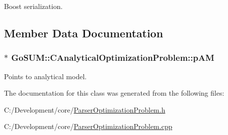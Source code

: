 Boost serialization. 



\subsection{Member Data Documentation}
\hypertarget{class_go_s_u_m_1_1_c_analytical_optimization_problem_a31c65e8da1ad012c97e4c722120b0b0e}{
\subsubsection[{p\-A\-M}]{$\ast$ Go\-S\-U\-M\-::\-C\-Analytical\-Optimization\-Problem\-::p\-A\-M\hspace{0.3cm}{\ttfamily [protected]}}}\label{class_go_s_u_m_1_1_c_analytical_optimization_problem_a31c65e8da1ad012c97e4c722120b0b0e}
Points to analytical model. 

The documentation for this class was generated from the following files\-:\begin{DoxyCompactItemize}
\item 
C\-:/\-Development/core/\hyperlink{_parser_optimization_problem_8h}{Parser\-Optimization\-Problem.\-h}\item 
C\-:/\-Development/core/\hyperlink{_parser_optimization_problem_8cpp}{Parser\-Optimization\-Problem.\-cpp}\end{DoxyCompactItemize}
